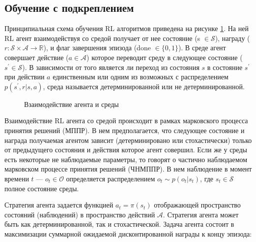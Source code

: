 \subsection{Обучение с подкреплением}

Принципиальная схема обучения RL алгоритмов приведена на рисунке \ref{fig:rl}. На ней RL агент взаимодействуя со средой получает от нее состояние (s $\in \mathcal{S}$), награду ($r: \mathcal{S} \times \mathcal{A} \to \mathbb{R}$), и флаг завершения эпизода (done $\in \{0, 1\}$).  В среде агент совершает действие ($a \in \mathcal{A}$) которое переводит среду в следующее состояние ($s^{\prime} \in \mathcal{S}$). В зависимости от того является ли переход из состояния $s$ в состояние $s^{\prime}$ при действии $a$ единственным или одним из возможных с распределением $p(s^{\prime},r|s,a)$, среда называется детерминированной или не детерминированной. 

\begin{figure}[ht]
	\caption{Взаимодействие агента и среды}
	\label{fig:rl}
\end{figure}

Взаимодействие RL агента со средой происходит в рамках марковского процесса принятия решений (МППР). В нем предполагается, что следующее состояние и награда получаемая агентом зависит (детерминировано или стохастически) только от предыдущего состояния и действия которое агент совершил. Если же у среды есть некоторые не наблюдаемые параметры, то говорят о частично наблюдаемом марковском процессе принятия решений (ЧНМППР). В нем наблюдение в момент времени $t$ --- $o_t \in \mathcal{O}$ определяется распределением $o_t \sim p(o_t|s_t)$, где $s_t \in \mathcal{S}$ полное состояние среды. 

Стратегия агента задается функцией $a_t=\pi(s_t)$ отображающей пространство состояний (наблюдений) в пространство действий $\mathcal{A}$. Стратегия агента может быть как детерминированной, так и стохастической. Задача агента состоит в максимизации суммарной ожидаемой дисконтированной награды к концу эпизода:

